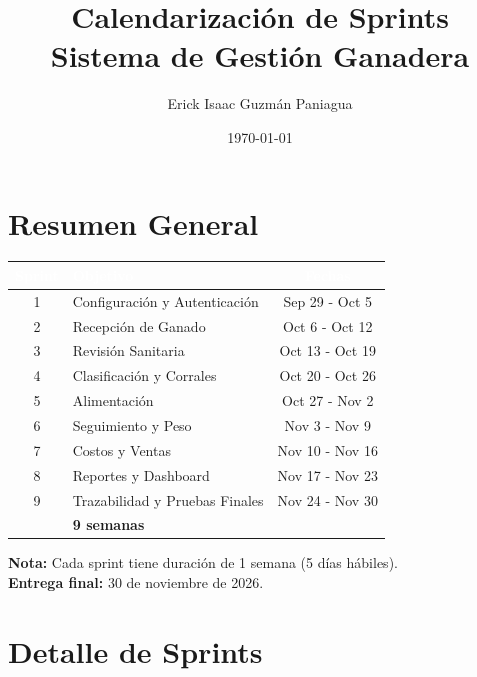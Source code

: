 \documentclass[11pt,a4paper]{article}
\title{\textcolor{verde}{\textbf{Calendarización de Sprints}}\\
\large Sistema de Gestión Ganadera}
\author{Erick Isaac Guzmán Paniagua}
\date{\today}
\begin{document}
\maketitle

\section*{Resumen General}

\begin{center}
\begin{tabularx}{\textwidth}{|c|X|c|}
\hline
\rowcolor{verde}
\textcolor{white}{\textbf{Sprint}} & 
\textcolor{white}{\textbf{Objetivo}} & 
\textcolor{white}{\textbf{Fechas}} \\
\hline
1 & Configuración y Autenticación & Sep 29 - Oct 5 \\
\hline
2 & Recepción de Ganado & Oct 6 - Oct 12 \\
\hline
3 & Revisión Sanitaria & Oct 13 - Oct 19 \\
\hline
4 & Clasificación y Corrales & Oct 20 - Oct 26 \\
\hline
5 & Alimentación & Oct 27 - Nov 2 \\
\hline
6 & Seguimiento y Peso & Nov 3 - Nov 9 \\
\hline
7 & Costos y Ventas & Nov 10 - Nov 16 \\
\hline
8 & Reportes y Dashboard & Nov 17 - Nov 23 \\
\hline
9 & Trazabilidad y Pruebas Finales & Nov 24 - Nov 30 \\
\hline
\rowcolor{verdeclaro}
\multicolumn{2}{|c|}{\textbf{Duración Total}} & \textbf{9 semanas} \\
\hline
\end{tabularx}
\end{center}

\vspace{0.3cm}

\textbf{Nota:} Cada sprint tiene duración de 1 semana (5 días hábiles).\\
\textbf{Entrega final:} 30 de noviembre de 2026.

\newpage


\section*{Detalle de Sprints}
\end{document}
